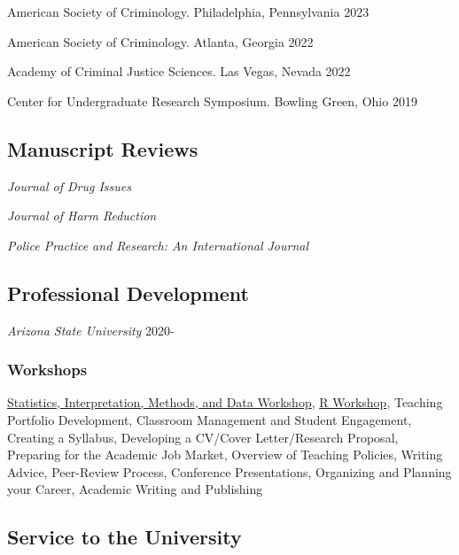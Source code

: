 \documentclass[11pt,]{article}
\begin{document}
American Society of Criminology. Philadelphia, Pennsylvania \hfill 2023

American Society of Criminology. Atlanta, Georgia \hfill 2022

Academy of Criminal Justice Sciences. Las Vegas, Nevada \hfill 2022

Center for Undergraduate Research Symposium. Bowling Green, Ohio
\hfill 2019

\vspace{2mm}

\hypertarget{manuscript-reviews}{%
\subsection{Manuscript Reviews}\label{manuscript-reviews}}

\emph{Journal of Drug Issues}

\emph{Journal of Harm Reduction}

\emph{Police Practice and Research: An International Journal}

\vspace{2mm}

\hypertarget{professional-development}{%
\subsection{Professional Development}\label{professional-development}}

\emph{Arizona State University} \hfill 2020-

\hypertarget{workshops}{%
\subsubsection{Workshops}\label{workshops}}

\href{https://sites.google.com/view/simdworkshop/home}{Statistics,
Interpretation, Methods, and Data Workshop},
\href{https://jacobtnyoung.github.io/RWorkshop/}{R Workshop}, Teaching
Portfolio Development, Classroom Management and Student Engagement,
Creating a Syllabus, Developing a CV/Cover Letter/Research Proposal,
Preparing for the Academic Job Market, Overview of Teaching Policies,
Writing Advice, Peer-Review Process, Conference Presentations,
Organizing and Planning your Career, Academic Writing and Publishing

\vspace{2mm}

\hypertarget{service-to-the-university}{%
\subsection{Service to the University}\label{service-to-the-university}}
\end{document}
